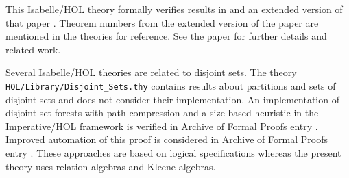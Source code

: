 \documentclass[11pt,a4paper]{article}
\begin{document}
This Isabelle/HOL theory formally verifies results in \cite{Guttmann2020b} and an extended version of that paper \cite{Guttmann2023}.
Theorem numbers from the extended version of the paper are mentioned in the theories for reference.
See the paper for further details and related work.

Several Isabelle/HOL theories are related to disjoint sets.
The theory \texttt{HOL/Library/Disjoint\_Sets.thy} contains results about partitions and sets of disjoint sets and does not consider their implementation.
An implementation of disjoint-set forests with path compression and a size-based heuristic in the Imperative/HOL framework is verified in Archive of Formal Proofs entry \cite{LammichMeis2012}.
Improved automation of this proof is considered in Archive of Formal Proofs entry \cite{Zhan2018}.
These approaches are based on logical specifications whereas the present theory uses relation algebras and Kleene algebras.

\begin{flushleft}

\end{flushleft}



\end{document}
